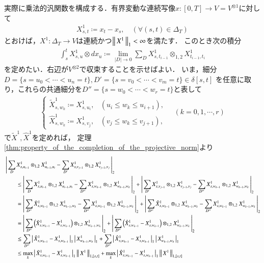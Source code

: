 	実際に乗法的汎関数を構成する．有界変動な連続写像$x:[0,T] \longrightarrow V = V^{\otimes 1}$に対して
	\begin{align}
		X^1_{s,t} \coloneqq x_t - x_s,
		\quad (\forall (s,t) \in \Delta_T)
	\end{align}
	とおけば，$X^1:\Delta_T \longrightarrow V$は連続かつ$\left\|\, X^1\, \right\|_{1} < \infty$を満たす．
	このとき次の積分
	\begin{align}
		\int_s^t X^1_{s,u} \otimes d x_u
		\coloneqq \lim_{|D| \to 0} \sum_{D} X^1_{s,t_{i-1}} \otimes_{1,2} X^1_{t_{i-1},t_i}
	\end{align}
	を定めたい．右辺が$V^{\otimes 2}$で収束することを示せばよい．
	いま，細分$D=\{s=u_0 < \cdots <u_n= t\},D'=\{s=v_0 < \cdots <v_m= t\} \in \delta[s,t]$
	を任意に取り，これらの共通細分を$D''=\{s=w_0 < \cdots < w_r = t\}$と表して
	\begin{align}
		\begin{cases}
			\tilde{X}^1_{s,w_k} \coloneqq X^1_{s,u_i}, & (u_i \leq w_k \leq u_{i+1}), \\
			\hat{X}^1_{s,w_k} \coloneqq X^1_{s,v_j}, & (v_j \leq w_k \leq v_{j+1}),
		\end{cases}
		\quad (k=0,1,\cdots,r)
	\end{align}
	で$\tilde{X}^1,\hat{X}^1$を定めれば，
	定理\ref{thm:property_of_the_completion_of_the_projective_norm}より
	\begin{align}
		&\left|\,  \sum_D X^1_{s,u_{i-1}} \otimes_{1,2} X^1_{u_{i-1},u_i} - 
			\sum_{D'} X^1_{s,v_{j-1}} \otimes_{1,2} X^1_{v_{j-1},v_j}\, \right|_{2} \\
		&\qquad\leq \left|\,  \sum_D X^1_{s,u_{i-1}} \otimes_{1,2} X^1_{u_{i-1},u_i} - 
			\sum_{D''} X^1_{s,w_{k-1}} \otimes_{1,2} X^1_{w_{k-1},w_k}\, \right|_{2}
			+ \left|\,  \sum_{D'} X^1_{s,v_{j-1}} \otimes_{1,2} X^1_{v_{j-1},v_j} - 
			\sum_{D''} X^1_{s,w_{k-1}} \otimes_{1,2} X^1_{w_{k-1},w_k}\, \right|_{2} \\
		&\qquad= \left|\,  \sum_{D''} \tilde{X}^1_{s,w_{k-1}} \otimes_{1,2} X^1_{w_{k-1},w_k} - 
			\sum_{D''} X^1_{s,w_{k-1}} \otimes_{1,2} X^1_{w_{k-1},w_k}\, \right|_{2} 
			+ \left|\,  \sum_{D''} \hat{X}^1_{s,w_{k-1}} \otimes_{1,2} X^1_{w_{k-1},w_k} - 
			\sum_{D''} X^1_{s,w_{k-1}} \otimes_{1,2} X^1_{w_{k-1},w_k}\, \right|_{2} \\
		&\qquad= \left|\,  \sum_{D''} \left(\tilde{X}^1_{s,w_{k-1}} -  X^1_{s,w_{k-1}} \right)
		 	\otimes_{1,2} X^1_{w_{k-1},w_k}\, \right|_{2}
			+ \left|\,  \sum_{D''} \left( \hat{X}^1_{s,w_{k-1}} - X^1_{s,w_{k-1}} \right)
			 \otimes_{1,2} X^1_{w_{k-1},w_k}\, \right|_{2} \\
		&\qquad\leq \sum_{D''} \left|\, \tilde{X}^1_{s,w_{k-1}} -  X^1_{s,w_{k-1}}\, \right|_{1} \left|\, X^1_{w_{k-1},w_k}\, \right|_{1}
			+ \sum_{D''} \left|\, \hat{X}^1_{s,w_{k-1}} -  X^1_{s,w_{k-1}}\, \right|_{1} \left|\, X^1_{w_{k-1},w_k}\, \right|_{1} \\
		&\qquad\leq \operatorname*{max}_{k} \left|\, \tilde{X}^1_{s,w_{k-1}} -  X^1_{s,w_{k-1}}\, \right|_{1} 
			\left\|\, X^1\, \right\|_{1,[s,t]} + \operatorname*{max}_{k} \left|\, \hat{X}^1_{s,w_{k-1}} -  X^1_{s,w_{k-1}}\, \right|_{1} 
			\left\|\, X^1\, \right\|_{1,[s,t]}
	\end{align}
